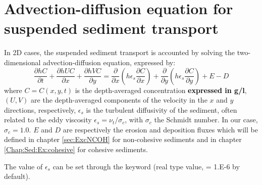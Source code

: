 \section{Advection-diffusion equation for suspended sediment transport}
\label{sec:ADE:suspended}
In 2D cases, the suspended sediment transport is accounted by solving the two-dimensional advection-diffusion equation, expressed by:
\begin{equation}\label{eq:2DADE}
\frac{\partial hC}{\partial t} + \frac{\partial hUC}{\partial x} + \frac{\partial hVC}{\partial y} =
\frac{\partial}{\partial x}\left(h\epsilon_s\frac{\partial C}{\partial x}\right) +
\frac{\partial}{\partial y}\left(h\epsilon_s\frac{\partial C}{\partial y}\right) + E-D
\end{equation}
where $C=C(x,y,t)$ is the depth-averaged concentration \textcolor{black}{\bf expressed in g/l}, $(U,V)$ are the depth-averaged components of the velocity in the $x$ and $y$ directions, respectively, $\epsilon_s$ is the turbulent diffusivity of the sediment, often related to the eddy viscosity $\epsilon_s=\nu_t/\sigma_c$, with $\sigma_c$ the Schmidt number. In our case, $\sigma_c=1.0$.
$E$ and $D$ are respectively the erosion and deposition fluxes which will be defined in chapter \ref{sec:ExcNCOH} for non-cohesive sediments and in chapter \ref{Chap:Sed:Ex:cohesive} for cohesive sediments.

The value of $\epsilon_s$ can be set through the keyword  (real type value, {\ttfamily = 1.E-6} by
default).

